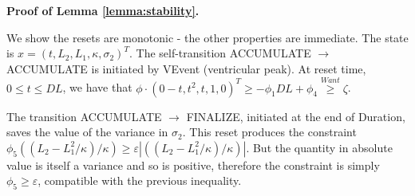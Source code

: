 {\large \textbf{Proof of Lemma \ref{lemma:stability}.}}
\begin{prf}
We show the resets are monotonic - the other properties are immediate.
The state is $x = (t,L_2,L_1,\kappa,\sigma_2)^T$.
The self-transition ACCUMULATE $\rightarrow$ ACCUMULATE is initiated by VEvent (ventricular peak).
At reset time, $0 \leq t \leq DL$, we have that 
$\phi\cdot(0-t,t^2,t,1,0)^T \geq -\phi_1 DL + \phi_4 \stackrel{Want}{\geq} \zeta$.

The transition ACCUMULATE $\rightarrow$ FINALIZE, initiated at the end of Duration, saves the value of the variance in $\sigma_2$.
This reset produces the constraint
$\phi_5 ((L_2 -L_1^2/\kappa)/\kappa) \geq \varepsilon |((L_2 -L_1^2/\kappa)/\kappa)|$.
But the quantity in absolute value is itself a variance and so is positive, therefore the constraint is simply $\phi_5 \geq \varepsilon$, compatible with the previous inequality.
\end{prf}